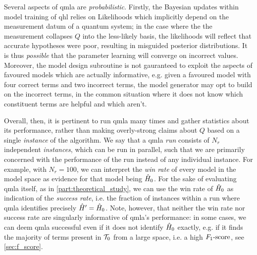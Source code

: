 Several aspects of \gls{qmla} are \emph{probabilistic}.
Firstly, the Bayesian updates within model training of \gls{qhl} relies on Likelihoods which 
    implicitly depend on the measurement datum of a quantum system; 
    in the case where the the measurement collapses $Q$ into the less-likely basis, 
    the likelihoods will reflect that accurate hypotheses were poor, 
    resulting in misguided posterior distributions. 
It is thus \emph{possible} that the parameter learning will converge on incorrect values. 
Moreover, the model design subroutine is not gauranteed to exploit the aspects of favoured models which are 
    actually informative, e.g. given a favoured model with four correct terms and two incorrect terms, 
    the model generator may opt to build on the incorrect terms, in the common situation where it does not know 
    which constituent terms are helpful and which aren't. 
\par 
Overall, then, it is pertinent to run \gls{qmla} many times and gather statistics about its performance, 
    rather than making overly-strong claims about $Q$ based on a single \emph{instance} of the algorithm. 
We say that a \gls{qmla} \emph{\gls{run}} consists of $N_r$ independent \emph{\glspl{instance}},
    which can be run in parallel, such that we are primarily concerned with the performance of the run 
    instead of any individual instance. 
For example, with $N_r=100$, we can interpret the \emph{\gls{win rate}} of every model in the model space
    as evidence for that model being $\hat{H}_0$.
For the sake of evaluating \gls{qmla} itself, as in \cref{part:theoretical_study}, 
    we can use the \gls{win rate} of $\hat{H}_0$ as indication of the \emph{\gls{success rate}}, 
    i.e. the fraction of instances within a run where \gls{qmla} identifies precisely $\hat{H}^{\prime} = \hat{H}_0$. 
Note, however, that neither the \gls{win rate} nor \gls{success rate} are singularly informative 
    of \gls{qmla}'s performance: in some cases, we can deem \gls{qmla} successful even if it does not 
    identify $\hat{H}_0$ exactly, e.g. if it finds the majority of terms present in ${ \mathcal{T} }_0$ from a large space, 
    i.e. a high $ F_{1}\text{-score} $, see \cref{sec:f_score}. 


